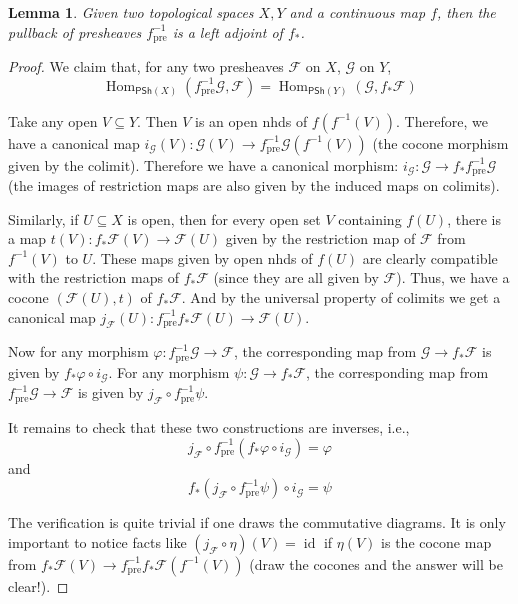 \documentclass[12pt]{article}
\newtheorem{lemma}{Lemma}[subsection]
\theoremstyle{remark}
\newcommand{\Hom}[0]{\operatorname{Hom}}
\newcommand{\id}[0]{\operatorname{id}}
\begin{document}
	\begin{lemma}\label{l143}
		Given two topological spaces $X, Y$ and a continuous map $f$, then the pullback of presheaves $f_{\mathrm{pre}}^{-1}$ is a left adjoint of $f_*$.
	\end{lemma}
	\begin{proof}
		We claim that, for any two presheaves $\mathscr F$ on $X$, $\mathscr G$ on $Y$, 
		\[\Hom_{\mathsf{PSh}(X)}(f_{\mathrm{pre}}^{-1}\mathscr G, \mathscr F)=\Hom_{\mathsf{PSh}(Y)}(\mathscr G, f_*\mathscr F)\]
		
		Take any open $V\subseteq Y$. Then $V$ is an open nhds of $f(f^{-1}(V))$. Therefore, we have a canonical map $i_{\mathscr G}(V):\mathscr G(V)\to f_{\mathrm{pre}}^{-1}\mathscr G(f^{-1}(V))$ (the cocone morphism given by the colimit). Therefore we have a canonical morphism: $i_{\mathscr G}:\mathscr G\to f_*f_{\mathrm{pre}}^{-1}\mathscr G$ (the images of restriction maps are also given by the induced maps on colimits).

		Similarly, if $U\subseteq X$ is open, then for every open set $V$ containing $f(U)$, there is a map $t(V):f_*\mathscr F(V)\to \mathscr F(U)$ given by the restriction map of $\mathscr F$ from $f^{-1}(V)$ to $U$. These maps given by open nhds of $f(U)$ are clearly compatible with the restriction maps of $f_*\mathscr F$ (since they are all given by $\mathscr F$). Thus, we have a cocone $(\mathscr F(U), t)$ of $f_*\mathscr F$. And by the universal property of colimits we get a canonical map $j_{\mathscr F}(U):f_{\mathrm{pre}}^{-1}f_*\mathscr F(U)\to \mathscr F(U)$.

		Now for any morphism $\varphi:f_{\mathrm{pre}}^{-1}\mathscr G\to \mathscr F$, the corresponding map from $\mathscr G\to f_*\mathscr F$ is given by $f_*\varphi\circ i_{\mathscr G}$. For any morphism $\psi:\mathscr G\to f_*\mathscr F$, the corresponding map from $f_{\mathrm{pre}}^{-1}\mathscr G\to \mathscr F$ is given by $j_{\mathscr F}\circ f_{\mathrm{pre}}^{-1}\psi$.

		It remains to check that these two constructions are inverses, i.e.,
		\[j_{\mathscr F}\circ f_{\mathrm{pre}}^{-1}(f_*\varphi\circ i_{\mathscr G})=\varphi\]
		and
		\[f_*(j_{\mathscr F}\circ f_{\mathrm{pre}}^{-1}\psi)\circ i_{\mathscr G}=\psi\]

		The verification is quite trivial if one draws the commutative diagrams. It is only important to notice facts like $(j_{\mathscr F}\circ\eta)(V)=\id$ if $\eta(V)$ is the cocone map from $f_*\mathscr F(V)\to f^{-1}_{\mathrm{pre}}f_*\mathscr F(f^{-1}(V))$ (draw the cocones and the answer will be clear!).
	\end{proof}
\end{document}
